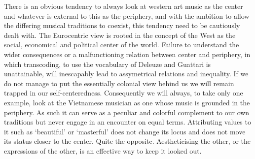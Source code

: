\documentclass[a4paper]{article}
\begin{document}
There is an obvious tendency to always look at western art music as the center and whatever is external to this as the periphery, and with the ambition to allow the differing musical traditions to coexist, this tendency need to be cautiously dealt with. The Eurocentric view is rooted in the concept of the West as the social, economical and political center of the world. Failure to understand the wider consequences or a malfunctioning relation between center and periphery, in which transcoding, to use the vocabulary of Deleuze and Guattari is unattainable, will inescapably lead to assymetrical relations and inequality. If we do not manage to put the essentially colonial view behind us we will remain trapped in our self-centeredness. Consequently we will always, to take only one example, look at the Vietnamese musician as one whose music is grounded in the periphery. As such it can serve as a peculiar and colorful complement to our own traditions but never engage in an encounter on equal terms. Attributing values to it such as `beautiful' or `masterful' does not change its locus and does not move its status closer to the center. Quite the opposite. Aestheticising the other, or the expressions of the other, is an effective way to keep it looked out.
\end{document}
